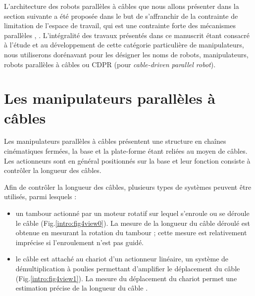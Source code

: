 L'architecture des robots parallèles à c\^ables que nous allons présenter dans 
la section suivante a été proposée dans le but de s'affranchir de la contrainte 
de limitation de l'espace de travail, qui est une contrainte forte des 
mécanismes parallèles \cite{journals/jfr/AlbusBD93}, 
\cite{1985:Landsberger.Sheridan*1}. L'intégralité des travaux présentés 
dans ce manuscrit étant consacré à l'étude et au développement de cette 
catégorie particulière de manipulateurs, nous utiliserons dorénavant pour les 
désigner les noms de robots, manipulateurs, robots parallèles à câbles ou CDPR 
(pour {\it cable-driven parallel robot}).

\section{Les manipulateurs parallèles à câbles} \label{chap0-1}

Les manipulateurs parallèles à câbles présentent une structure en chaînes 
cinéma\-tiques fermées, la base et la plate-forme étant reliées au moyen de 
câbles. Les actionneurs sont en général positionnés sur la base et leur 
fonction consiste à contrôler la longueur des câbles.

Afin de contrôler la longueur des câbles, plusieurs types de systèmes peuvent 
être utilisés, parmi lesquels :
\begin{itemize}
 \item un tambour actionné par un moteur rotatif sur lequel s'enroule ou se 
déroule le câble (Fig.\ref{intro:fig4view0}). La mesure de la longueur du câble 
déroulé est obtenue en mesurant la rotation du tambour ; cette mesure est 
relativement imprécise si l'enroulement n'est pas guidé.
 \item le câble est attaché au chariot d'un actionneur linéaire, un système de 
démultiplication à poulies permettant d'amplifier le déplacement du câble 
(Fig.\ref{intro:fig4view1}). La mesure du déplacement du chariot permet une 
estimation précise de la longueur du câble \cite{merlet2008}. 
\end{itemize}


